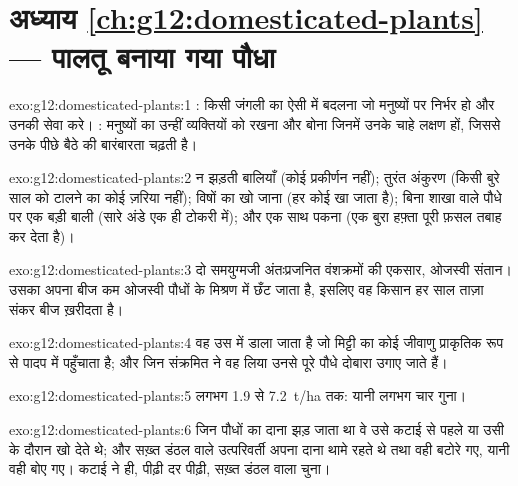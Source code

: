 \section*{अध्याय \ref{ch:g12:domesticated-plants} --- पालतू बनाया गया पौधा}

\begin{solution}{exo:g12:domesticated-plants:1}
: किसी जंगली  का ऐसी  में बदलना जो मनुष्यों पर निर्भर हो और
उनकी सेवा करे। : मनुष्यों का उन्हीं व्यक्तियों को रखना और बोना
जिनमें उनके चाहे लक्षण हों, जिससे उनके पीछे बैठे  की
बारंबारता चढ़ती है।
\end{solution}

\begin{solution}{exo:g12:domesticated-plants:2}
न झड़ती बालियाँ (कोई प्रकीर्णन नहीं); तुरंत अंकुरण (किसी बुरे साल को टालने
का कोई ज़रिया नहीं); विषों का खो जाना (हर कोई खा जाता है); बिना शाखा वाले
पौधे पर एक बड़ी बाली (सारे अंडे एक ही टोकरी में); और एक साथ पकना (एक बुरा
हफ़्ता पूरी फ़सल तबाह कर देता है)।
\end{solution}

\begin{solution}{exo:g12:domesticated-plants:3}
दो समयुग्मजी अंतःप्रजनित वंशक्रमों की एकसार, ओजस्वी संतान। उसका अपना बीज कम
ओजस्वी पौधों के मिश्रण में छँट जाता है, इसलिए वह किसान हर साल ताज़ा संकर
बीज ख़रीदता है।
\end{solution}

\begin{solution}{exo:g12:domesticated-plants:4}
वह  उस  में डाला जाता है जो मिट्टी का कोई जीवाणु प्राकृतिक रूप से पादप
 में पहुँचाता है; और जिन संक्रमित  ने वह  लिया उनसे पूरे
पौधे दोबारा उगाए जाते हैं।
\end{solution}

\begin{solution}{exo:g12:domesticated-plants:5}
लगभग \num{1.9} से \qty{7.2}{t/ha} तक: यानी लगभग चार गुना।
\end{solution}

\begin{solution}{exo:g12:domesticated-plants:6}
जिन पौधों का दाना झड़ जाता था वे उसे कटाई से पहले या उसी के दौरान खो देते
थे; और सख़्त डंठल वाले उत्परिवर्ती अपना दाना थामे रहते थे तथा वही बटोरे
गए, यानी वही बोए गए। कटाई ने ही, पीढ़ी दर पीढ़ी, सख़्त डंठल वाला
 चुना।
\end{solution}

